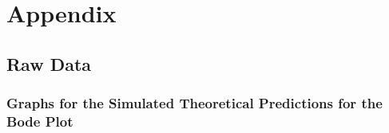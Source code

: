 \documentclass[12pt]{article}
\begin{document}
\section*{Appendix} \label{sec:A}

\subsection*{Raw Data} \label{sec:A.1}

\subsubsection*{Graphs for the Simulated Theoretical Predictions for the Bode Plot} \label{sec:A.1.1}

\vspace{1cm}
\end{document}
